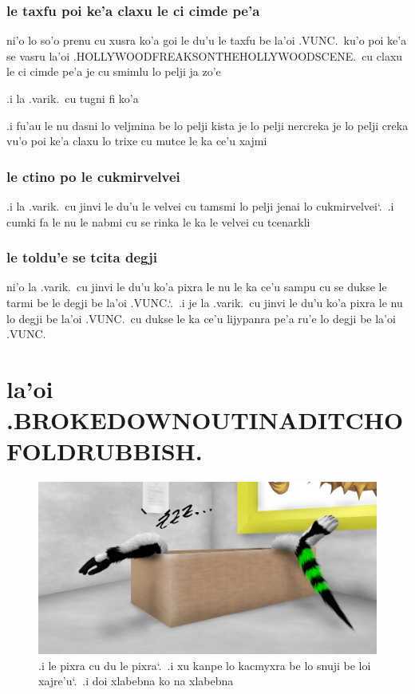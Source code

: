 \documentclass{report}
\newcommand\sds{\spacefactor\sfcode`.\ \space}
\begin{document}
\subsection{le taxfu poi ke'a claxu le ci cimde pe'a}
ni'o lo so'o prenu cu xusra ko'a goi le du'u le taxfu be la'oi .VUNC.\ ku'o poi ke'a se vasru la'oi .HOLLYWOODFREAKSONTHEHOLLYWOODSCENE.\ cu claxu le ci cimde pe'a je cu smimlu lo pelji ja zo'e

.i la .varik.\ cu tugni fi ko'a

.i fu'au le nu dasni lo veljmina be lo pelji kista je lo pelji nercreka je lo pelji creka vu'o poi ke'a claxu lo trixe cu mutce le ka ce'u xajmi

\subsection{le ctino po le cukmirvelvei}
.i la .varik.\ cu jinvi le du'u le velvei cu tamsmi lo pelji jenai lo cukmirvelvei\sds  .i cumki fa le nu le nabmi cu se rinka le ka le velvei cu tcenarkli

\subsection{le toldu'e se tcita degji}
ni'o la .varik.\ cu jinvi le du'u ko'a pixra le nu le ka ce'u sampu cu se dukse le tarmi be le degji be la'oi .VUNC.\sds  .i je la .varik.\ cu jinvi le du'u ko'a pixra le nu lo degji be la'oi .VUNC.\ cu dukse le ka ce'u lijypanra pe'a ru'e lo degji be la'oi .VUNC.

\chapter{la'oi .BROKEDOWNOUTINADITCHOFOLDRUBBISH.}
\begin{figure}[ht]
	\centering
	\includegraphics[width=\textwidth]{brokedownoutinaditchofoldrubbish/brokedownoutinaditchofoldrubbish.png}
	\caption[center]{.i le pixra cu du le pixra\sds  .i xu kanpe lo kacmyxra be lo snuji be loi xajre'u\sds  .i doi xlabebna ko na xlabebna}
\end{figure}
\end{document}
